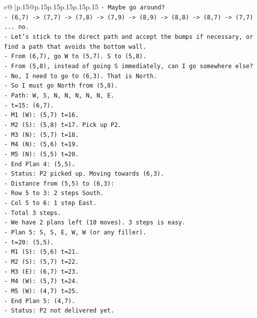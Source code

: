 \documentclass{article}
\begin{document}
{\begin{supertabular}{c@{$\;$}|p{.15\linewidth}@{}p{.15\linewidth}p{.15\linewidth}p{.15\linewidth}p{.15\linewidth}p{.15\linewidth}}
{{{\texttt{{-} Maybe go around?} \\
\texttt{{-} (6,7) {-}> (7,7) {-}> (7,8) {-}> (7,9) {-}> (8,9) {-}> (8,8) {-}> (8,7) {-}> (7,7) ... no.} \\
\texttt{{-} Let's stick to the direct path and accept the bumps if necessary, or find a path that avoids the bottom wall.} \\
\texttt{{-} From (6,7), go W to (5,7). S to (5,8).} \\
\texttt{{-} From (5,8), instead of going S immediately, can I go somewhere else?} \\
\texttt{{-} No, I need to go to (6,3). That is North.} \\
\texttt{{-} So I must go North from (5,8).} \\
\texttt{{-} Path: W, S, N, N, N, N, N, E.} \\
\texttt{{-} t=15: (6,7).} \\
\texttt{{-} M1 (W): (5,7) t=16.} \\
\texttt{{-} M2 (S): (5,8) t=17. Pick up P2.} \\
\texttt{{-} M3 (N): (5,7) t=18.} \\
\texttt{{-} M4 (N): (5,6) t=19.} \\
\texttt{{-} M5 (N): (5,5) t=20.} \\
\texttt{{-} End Plan 4: (5,5).} \\
\texttt{{-} Status: P2 picked up. Moving towards (6,3).} \\
\texttt{{-} Distance from (5,5) to (6,3):} \\
\texttt{{-} Row 5 to 3: 2 steps South.} \\
\texttt{{-} Col 5 to 6: 1 step East.} \\
\texttt{{-} Total 3 steps.} \\
\texttt{{-} We have 2 plans left (10 moves). 3 steps is easy.} \\
\texttt{{-} Plan 5: S, S, E, W, W (or any filler).} \\
\texttt{{-} t=20: (5,5).} \\
\texttt{{-} M1 (S): (5,6) t=21.} \\
\texttt{{-} M2 (S): (5,7) t=22.} \\
\texttt{{-} M3 (E): (6,7) t=23.} \\
\texttt{{-} M4 (W): (5,7) t=24.} \\
\texttt{{-} M5 (W): (4,7) t=25.} \\
\texttt{{-} End Plan 5: (4,7).} \\
\texttt{{-} Status: P2 not delivered yet.} \\
}}}
\end{supertabular}}
\end{document}
